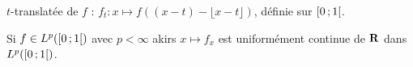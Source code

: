 \begin{defn}
	$t$-translatée de $f$ : $f_t \colon x \mapsto f \left( (x - t) - \lfloor x - t \rfloor \right)$, définie sur $\intfo{0}{1}$.
\end{defn}

\begin{thm}
	Si $f \in L^p(\intfo{0}{1})$ avec $p < \infty$ akirs $x \mapsto f_x$ est uniformément continue de $\R$ dans $L^p (\intfo{0}{1})$.
\end{thm} 
